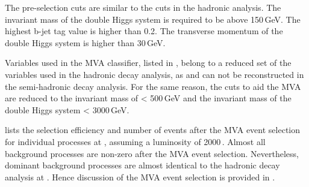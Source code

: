 The pre-selection cuts are similar to the cuts in the hadronic analysis. The invariant mass of the double Higgs system is required to be above 150\,GeV. The highest b-jet tag value is higher than 0.2. The transverse momentum of the double Higgs system is higher than 30\,GeV.

Variables used in the MVA classifier, listed in  ,  belong to  a reduced set of the variables  used in the hadronic decay analysis, as \Hbb and \PW can not be reconstructed in the semi-hadronic decay analysis. For the same reason, the cuts to aid the MVA are reduced to the invariant mass of \Hbb < 500\,GeV and the invariant mass of the double Higgs system < 3000\,GeV.



 lists the  selection efficiency and number of events after the MVA event selection for individual processes at , assuming a luminosity of 2000\,.  Almost all background processes are non-zero after the MVA event selection. Nevertheless,  dominant background processes are almost identical to the hadronic decay analysis  at . Hence discussion of the MVA event selection is provided in .

